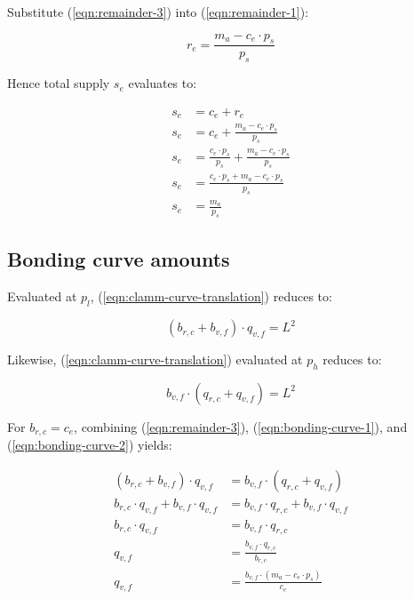 \documentclass[table, twocolumn]{article}
\begin{document}
Substitute (\ref{eqn:remainder-3}) into (\ref{eqn:remainder-1}):

\begin{equation} \label{eqn:remainder-5}
  r_e = \frac{m_a - c_e \cdot p_s}{p_s}
\end{equation}

Hence total supply $s_e$ evaluates to:

\begin{align} \label{eqn:remainder-6}
  s_e & = c_e + r_e \nonumber                                                   \\
  s_e & = c_e + \frac{m_a - c_e \cdot p_s}{p_s} \nonumber                       \\
  s_e & = \frac{c_e \cdot p_s}{p_s} + \frac{m_a - c_e \cdot p_s}{p_s} \nonumber \\
  s_e & = \frac{c_e \cdot p_s + m_a - c_e \cdot p_s}{p_s} \nonumber             \\
  s_e & = \frac{m_a}{p_s}
\end{align}

\subsection{Bonding curve amounts} \label{sec:bonding-curve-constraints}

Evaluated at $p_l$, (\ref{eqn:clamm-curve-translation}) reduces to:

\begin{equation} \label{eqn:bonding-curve-1}
  (b_{r, c} + b_{v, f}) \cdot q_{v, f} = L^2
\end{equation}

Likewise, (\ref{eqn:clamm-curve-translation}) evaluated at $p_h$ reduces to:

\begin{equation} \label{eqn:bonding-curve-2}
  b_{v, f} \cdot (q_{r, c} + q_{v, f}) = L^2
\end{equation}

For $b_{r, c} = c_e$, combining (\ref{eqn:remainder-3}),
(\ref{eqn:bonding-curve-1}), and (\ref{eqn:bonding-curve-2}) yields:

\begin{align} \label{eqn:bonding-curve-3}
  (b_{r, c} + b_{v, f}) \cdot q_{v, f}              & =
  b_{v, f} \cdot (q_{r, c} + q_{v, f}) \nonumber              \\
  b_{r, c} \cdot q_{v, f} + b_{v, f} \cdot q_{v, f} & =
  b_{v, f} \cdot q_{r, c} + b_{v, f} \cdot q_{v, f} \nonumber \\
  b_{r, c} \cdot q_{v, f}                           & =
  b_{v, f} \cdot q_{r, c} \nonumber                           \\
  q_{v, f}                                          & =
  \frac{b_{v, f} \cdot q_{r, c}}{b_{r, c}} \nonumber          \\
  q_{v, f}                                          & =
  \frac{b_{v, f} \cdot (m_a - c_e \cdot p_s)}{c_e}
\end{align}
\end{document}
